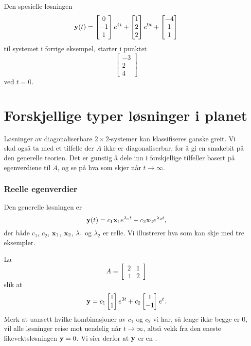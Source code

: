 \begin{ex}
Den spesielle løsningen 
\[
\mathbf{y}(t)=
\begin{bmatrix}
0 \\ -1 \\ 1
\end{bmatrix} e^{4t}
+
\begin{bmatrix}
1 \\ 2 \\ 2
\end{bmatrix}e^{9t}
+
\begin{bmatrix}
-4 \\ 1 \\ 1
\end{bmatrix}
\]
til systemet i forrige eksempel, starter i punktet 
\[
\begin{bmatrix}
-3 \\ 2 \\ 4
\end{bmatrix}
\]
ved $t=0$. \qedhere
\end{ex}

\section*{Forskjellige typer løsninger i planet}

Løsninger av diagonaliserbare $2 \times 2$-systemer kan klassifiseres ganske greit. 
Vi skal også ta med et tilfelle der $A$ ikke er diagonaliserbar, for å gi en smakebit på den generelle teorien. 
Det er gunstig å dele inn i forskjellige tilfeller basert på egenverdiene til $A$, og se på hva som skjer når $t \to \infty$.

\subsubsection*{Reelle egenverdier}
Den generelle løsningen er
\[
\mathbf{y}(t)=c_1\mathbf{x}_1e^{\lambda_1 t}+c_2\mathbf{x}_2e^{\lambda_2 t},
\]
der både $c_1$, $c_2$, $\mathbf{x}_1$, $\mathbf{x}_2$, $\lambda_1$ og $\lambda_2$ er relle. Vi illustrerer hva som kan skje med tre eksempler.

\begin{ex}
La 
\[
A=
\begin{bmatrix}
2 & 1  \\
1 & 2 
\end{bmatrix}
\]
slik at 
\[
\mathbf{y}=
c_1
\begin{bmatrix}
1  \\
1 
\end{bmatrix} e^{3t}
+
c_2
\begin{bmatrix}
1  \\
-1 
\end{bmatrix}e^{t}. 
\]
Merk at uansett hvilke kombinasjoner av $c_1$ og $c_2$ vi har, så lenge ikke begge er 0, 
vil alle løsninger reise mot uendelig når $t\to \infty$, altså vekk fra den eneste likevektsløsningen $\mathbf{y}=0$. 
Vi sier derfor at $\mathbf{y}$ er en .
\end{ex}

